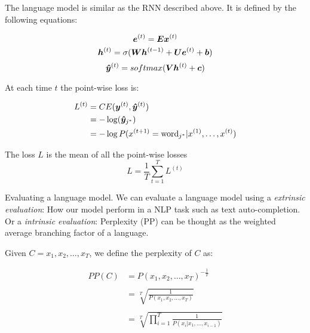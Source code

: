 The language model is similar as the RNN described above. It is defined by the following equations:

\begin{equation}
\bm{e}^{(t)} = \bm{E}\bm{x}^{(t)}
\end{equation}
\vspace{0.2cm}
 \begin{equation}
\bm{h}^{(t)} = \sigma(\bm{W}\bm{h}^{(t-1)}+ \bm{U}\bm{e}^{(t)}+ \bm{b})
\end{equation}
\vspace{0.2cm}
\begin{equation}
\bm{\hat{y}}^{(t)} = softmax(\bm{V}\bm{h}^{(t)} + \bm{c})
\end{equation}



At each time $t$ the point-wise loss is:

\vspace{0.2cm}

\begin{align}
L^{(t)} &= CE(\bm{y}^{(t)},\bm{\hat{y}}^{(t)})\\
    &= - \log(\bm{\hat{y}}_{j^{*}})\\
        &= - \log P(x^{(t+1)} = \text{word}_{j^{*}}|x^{(1)}, \dots, x^{(t)})
\end{align}

The loss $L$ is the mean of all the point-wise losses
\begin{equation}
L=\frac{1}{T}\sum_{t=1}^{T}L^{(t)}
\end{equation}


Evaluating a language model. We can evaluate a  language model using a \textit{extrinsic evaluation}: How our model perform in a NLP task such as text auto-completion. Or a \textit{intrinsic evaluation}: Perplexity (PP) can be thought as the weighted average branching factor of a language.


Given $C= x_1, x_2, \dots, x_T$, we define the perplexity of $C$ as:

\begin{align}
PP(C) &= P(x_1, x_2, \dots, x_T)^{-\frac{1}{T}}\\
    & \\
      &= \sqrt[T]{\frac{1}{P(x_1, x_2, \dots, x_T)}}\\
      & \\
      &= \sqrt[T]{\prod_{i=1}^{T}\frac{1}{P(x_i \vert x_1,\dots, x_{i-1})}}
\end{align}

